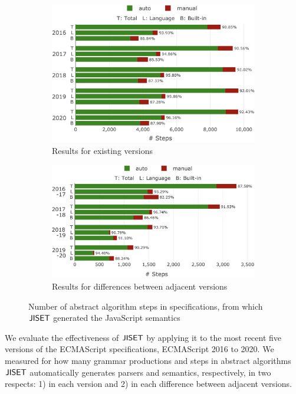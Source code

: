 \begin{figure}[t]
  \centering
  \begin{subfigure}{0.46\textwidth}
    \includegraphics[width=\textwidth]{img/sem-all.png}
    \caption{Results for existing versions}
    \label{fig:semantics-all-version}
  \end{subfigure}
  \hfill
  \begin{subfigure}{0.48\textwidth}
    \includegraphics[width=\textwidth]{img/sem-delta.png}
    \caption{Results for differences between adjacent versions}
    \label{fig:semantics-all-version-delta}
  \end{subfigure}
  \caption{Number of abstract algorithm steps in specifications, from which
\( \text{\sf JISET} \) generated the JavaScript semantics}
  \label{fig:all-version}
\vspace*{-1em}
\end{figure}

We evaluate the effectiveness of \( \text{\sf JISET} \) by applying it to the
most recent five versions of the ECMAScript specifications, ECMAScript
2016 to 2020.  We measured for how many grammar productions and
steps in abstract algorithms \( \text{\sf JISET} \) automatically generates parsers and
semantics, respectively, in two respects: 1) in each version and 2) in
each difference between adjacent versions.

